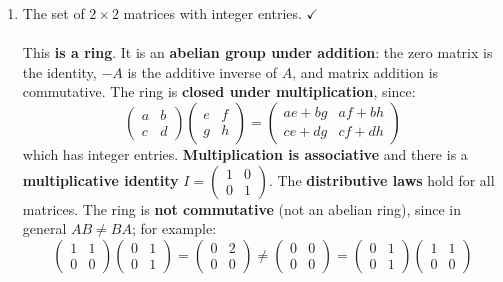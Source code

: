 \documentclass{article}
\begin{document}
\begin{enumerate}
\begin{enumerate}
            \item The set of $2 \times 2$ matrices with integer entries. $\checkmark$
            \\
            \\ This \textbf{is a ring}. It is an \textbf{abelian group under addition}: the zero matrix is the identity, $-A$ is the additive inverse of $A$, and matrix addition is commutative. The ring is \textbf{closed under multiplication}, since:
            \[
                \begin{pmatrix}a&b\\c&d\end{pmatrix}\begin{pmatrix}e&f\\g&h\end{pmatrix}
                = \begin{pmatrix}ae+bg & af+bh \\ ce+dg & cf+dh\end{pmatrix}
            \]
            which has integer entries. \textbf{Multiplication is associative} and there is a \textbf{multiplicative identity} $I = \begin{pmatrix}1&0\\0&1\end{pmatrix}$. The \textbf{distributive laws} hold for all matrices. The ring is \textbf{not commutative} (not an abelian ring), since in general $AB \neq BA$; for example:
            \[
                \begin{pmatrix}1&1\\0&0\end{pmatrix}\begin{pmatrix}0&1\\0&1\end{pmatrix}
                = \begin{pmatrix}0&2\\0&0\end{pmatrix}
                \neq
                \begin{pmatrix}0&0\\0&0\end{pmatrix}
                = \begin{pmatrix}0&1\\0&1\end{pmatrix}\begin{pmatrix}1&1\\0&0\end{pmatrix}
            \]


\end{enumerate}
\end{enumerate}
\end{document}
